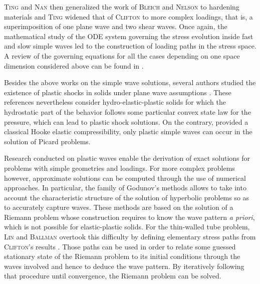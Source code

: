 \textsc{Ting} and \textsc{Nan} \cite{Ting68} then generalized the work of \textsc{Bleich} and \textsc{Nelson} to hardening materials and \textsc{Ting} \cite{Ting69} widened that of \textsc{Clifton} to more complex loadings, that is, a superimposition of one plane wave and two shear waves.
Once again, the mathematical study of the ODE system governing the stress evolution inside fast and slow simple waves led to the construction of loading paths in the stress space.
A review of the governing equations for all the cases depending on one space dimension considered above can be found in \cite{Nowacki}. %

Besides the above works on the simple wave solutions, several authors studied the existence of plastic shocks in solids under plane wave assumptions \cite{Mandel62,Rice,Morland,Germain_shock,Claude,Mandel2,Wang}.
These references nevertheless consider hydro-elastic-plastic solids for which the hydrostatic part of the behavior follows some particular convex state law for the pressure, which can lead to plastic shock solutions.
%
On the contrary, provided a classical Hooke elastic compressibility, only plastic simple waves can occur in the solution of Picard problems.

Research conducted on plastic waves enable the derivation of exact solutions for problems with simple geometries and loadings.
For more complex problems however, approximate solutions can be computed through the use of numerical approaches.
In particular, the family of Godunov's methods \cite{Godunov_method} allows to take into account the characteristic structure of the solution of hyperbolic problems so as to accurately capture waves.
These methods are based on the solution of a Riemann problem whose construction requires to know the wave pattern \textit{a priori}, which is not possible for elastic-plastic solids.
For the thin-walled tube problem, \textsc{Lin} and \textsc{Ballman} overtook this difficulty by defining elementary stress paths from \textsc{Clifton}'s results \cite{Lin_et_Ballman}.
Those paths can be used in order to relate some guessed stationary state of the Riemann problem to its initial conditions through the waves involved and hence to deduce the wave pattern.
By iteratively following that procedure until convergence, the Riemann problem can be solved. 

